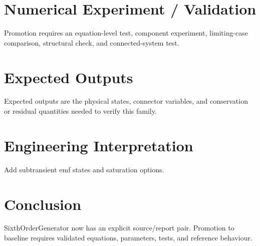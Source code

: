 \documentclass[10pt,a4paper]{article}
\begin{document}
\section{Numerical Experiment / Validation}Promotion requires an equation-level test, component experiment, limiting-case comparison, structural check, and connected-system test.
\section{Expected Outputs}Expected outputs are the physical states, connector variables, and conservation or residual quantities needed to verify this family.
\section{Engineering Interpretation}Add subtransient emf states and saturation options.
\section*{Conclusion}SixthOrderGenerator now has an explicit source/report pair. Promotion to baseline requires validated equations, parameters, tests, and reference behaviour.
\end{document}
